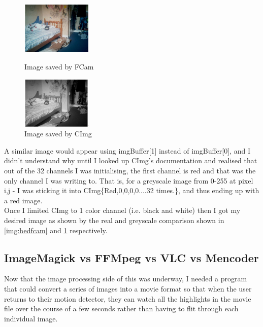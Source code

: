 \begin{figure}
	\vspace{-200pt}
	\begin{center}
		\includegraphics[width=0.3\textwidth]{../images/realbuffer2}
	\end{center}
	\vspace{-20pt}
	\caption{Image saved by FCam}\label{img:bedfcam}
	\vspace{0pt}
	\begin{center}
		\includegraphics[width=0.3\textwidth]{../images/blackbuffer3}
	\end{center}
	\vspace{-20pt}
	\caption{Image saved by CImg}\label{img:bedcimg}
	\vspace{-10pt}
\end{figure}

A similar image would appear using imgBuffer[1] instead of imgBuffer[0], and I didn't understand why until I looked up CImg's documentation and realised that out of the 32 channels I was initialising, the first channel is red and that was the only channel I was writing to.
That is, for a greyscale image from 0-255 at pixel i,j - I was sticking it into CImg\{Red,0,0,0,0....32 times.\}, and thus ending up with a red image.
\\Once I limited CImg to 1 color channel (i.e. black and white) then I got my desired image as shown by the real and greyscale comparison shown in \cref{img:bedfcam} and \cref{img:bedcimg} respectively.



\subsection{ImageMagick vs FFMpeg vs VLC vs Mencoder}
Now that the image processing side of this was underway, I needed a program that could convert a series of images into a movie format so that when the user returns to their motion detector, they can watch all the highlights in the movie file over the course of a few seconds rather than having to flit through each individual image.\\

